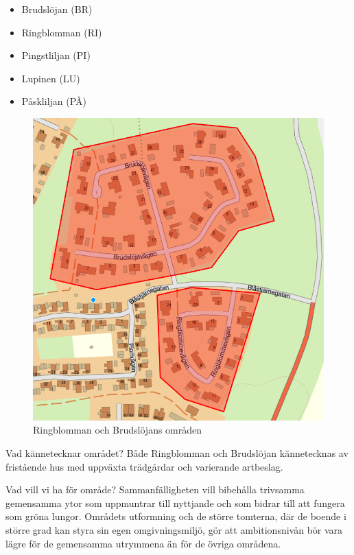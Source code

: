\documentclass[12pt,a4paper]{article}
\begin{document}
\begin{minipage}{0.5\textwidth}
\vspace{2mm}
\begin{itemize}
	\item Brudslöjan (BR)
	\item Ringblomman (RI)
	\item Pingstliljan (PI)
	\item Lupinen (LU)
	\item Påskliljan (PÅ)
\end{itemize}
\end{minipage}%
\begin{minipage}{0.5\textwidth}
\begin{figure}[h]
\includegraphics[width=\linewidthcm]{Ring+Brud.png}
\caption{\label{fig:Ring} Ringblomman och Brudslöjans områden}
\end{figure}
Vad kännetecknar området?
Både Ringblomman och Brudslöjan kännetecknas av fristående hus med uppväxta trädgårdar och varierande artbeslag. 

Vad vill vi ha för område?
Sammanfälligheten vill bibehålla trivsamma gemensamma ytor som uppmuntrar till nyttjande och som bidrar till att fungera som gröna lungor. 
Områdets utformning och de större tomterna, där de boende i större grad kan styra sin egen omgivningsmiljö, gör att ambitionsnivån bör vara lägre för de 
gemensamma utrymmena än för de övriga områdena. 


\end{minipage}
\end{document}
